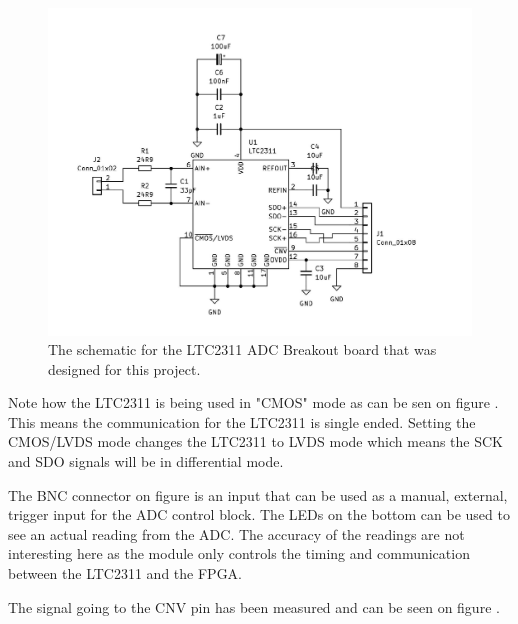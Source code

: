 \begin{figure}[H]
    \centering
    \includegraphics[clip, trim=0 0 0 0, width=1\textwidth]{Appendix/Figures/A_ADC_CONTROL_LTC2311SCH.pdf}
    \caption{The schematic for the LTC2311 ADC Breakout board that was designed for this project.}
    \label{fig:A_ADC_CONTROL_LTC2311SCH}
\end{figure}

Note how the LTC2311 is being used in "CMOS" mode as can be sen on figure . This means the communication for the LTC2311 is single ended. Setting the CMOS/LVDS mode changes the LTC2311 to LVDS mode which means the SCK and SDO signals will be in differential mode.

The BNC connector on figure  is an input that can be used as a manual, external, trigger input for the ADC control block. The LEDs on the bottom can be used to see an actual reading from the ADC. The accuracy of the readings are not interesting here as the module only controls the timing and communication between the LTC2311 and the FPGA.

The signal going to the CNV pin has been measured and can be seen on figure .

